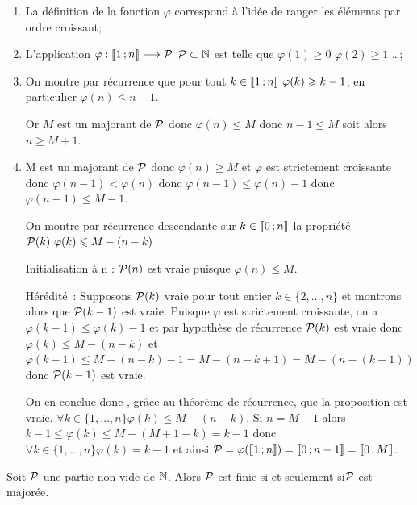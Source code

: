 \begin{enumerate}
  \item La définition de la fonction \(\varphi\) correspond à l'idée de 
    ranger les éléments par ordre croissant;
  \item L'application \(\fonctionR{\varphi}{\intervalleentier{1}{n}}{\P}\)
    \(\P \subset \N\) est telle que \(\varphi(1)\geqslant 0\) 
    \(\varphi(2)\geqslant 1\) \ldots;
  \item On montre par récurrence que pour tout \(k\in\intervalleentier{1}{n} 
    \ \varphi(k)\geqslant k - 1\), en particulier \(\varphi(n)\leqslant n - 
    1\). 

    Or \(M\) est un majorant de \(\P\) donc \(\varphi(n)\leqslant M\) donc 
    \(n - 1\leqslant M\) soit alors \(n\geqslant M + 1\).
  \item M est un majorant de \(\P\) donc \(\varphi(n)\geqslant M\) et 
    \(\varphi\) est strictement croissante donc \(\varphi(n - 
    1)<\varphi(n)\) donc \(\varphi(n - 1)\leqslant\varphi(n)-1\) donc 
    \(\varphi(n - 1)\leqslant M - 1\). 

    On montre par récurrence descendante sur \(k\in\intervalleentier{0}{n}\) 
    la propriété \(\P(k) \ \varphi(k)\leqslant M - (n - k)\)

    Initialisation à n : \(\P(n)\) est vraie puisque \(\varphi(n)\leqslant 
    M\).

    Hérédité~: Supposons \(\P(k)\) vraie pour tout entier \(k\in\{2, \ldots, 
    n\}\) et montrons alors que \(\P(k - 1)\) est vraie. Puisque \(\varphi\) 
    est strictement croissante, on a \(\varphi(k - 1)\leqslant 
    \varphi(k)-1\) et par hypothèse de récurrence \(\P(k)\) est vraie donc 
    \(\varphi(k)\leqslant M - (n - k)\) et \(\varphi(k - 1)\leqslant M - (n 
    - k)-1 = M - (n - k + 1) = M - (n - (k - 1))\) donc \(\P(k - 1)\) est 
    vraie. 

    On en conclue donc , grâce au théorème de récurrence, que la proposition 
    est vraie. \(\forall k \in \{1, \ldots, n\} \varphi(k)\leqslant M - (n - 
    k)\). Si \(n = M + 1\) alors \(k - 1\leqslant \varphi(k)\leqslant M - (M 
    + 1 - k) = k - 1\) donc \(\forall k \in \{1, \ldots, n\} \varphi(k) = k 
    - 1\) et ainsi \(\P = \varphi(\intervalleentier{1}{n}) = 
    \intervalleentier{0}{n - 1}= \intervalleentier{0}{M}\).
\end{enumerate}

\begin{prop}
  Soit \(\P\) une partie non vide de \(\N\). Alors \(\P\) est finie si et 
  seulement si\(\P\) est majorée.
\end{prop}

